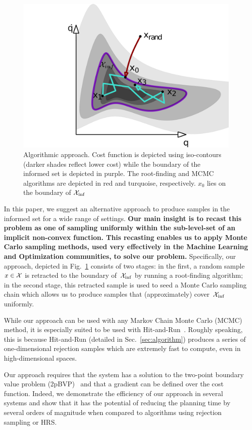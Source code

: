 \documentclass[letterpaper, 10 pt, conference]{ieeeconf}  %
\begin{document}
\begin{figure}[tb]
  \centering
  	\includegraphics[width=0.75\linewidth ]{fig/alg.pdf}
  \caption{
    \captionstyle
  	Algorithmic approach.
  	Cost function is depicted using iso-contours (darker shades reflect lower cost) while the boundary of the informed set is depicted in purple. 
  	The root-finding and MCMC algorithms are depicted in red and turquoise, respectively.
  	$ x_0 $ lies on the boundary of $ \mathcal{X}_{\rm {inf}} $
  	}
   	\label{fig:alg}
\end{figure}


In this paper, we suggest an alternative approach to produce samples in the informed set \Cinf for a wide range of settings.
\textbf{
Our main insight is to recast this problem as one of sampling uniformly within the sub-level-set of an implicit non-convex function.
This recasting enables us to apply Monte Carlo sampling methods, used very effectively in the Machine Learning and Optimization communities, to solve our problem.
}
Specifically, our approach, depicted in Fig.~\ref{fig:alg} consists of two stages:
in the first, a random sample $x \in \mathcal{X}$ is retracted to the boundary of~$\mathcal{X}_{\rm {inf}}$ by running a root-finding algorithm;
in the second stage, this retracted sample  is used to seed a Monte Carlo sampling chain which allows us to  produce samples that (approximately) cover~$\mathcal{X}_{\rm {inf}}$  uniformly.

While our approach can be used with any Markov Chain Monte Carlo (MCMC) method, it is especially suited to be used with Hit-and-Run~\cite{KSZ11}.
Roughly speaking, this is because Hit-and-Run (detailed in Sec.~\ref{sec:algorithm})
produces a series of one-dimensional rejection samples which are extremely fast to compute, even in high-dimensional spaces. 

Our approach requires that the system has a solution to the two-point boundary value problem (2pBVP)~\cite{L06} and that a gradient can be defined over the cost function.
Indeed, we demonstrate the efficiency of our approach in several systems and show that it has the potential of reducing the planning time by several orders of magnitude when compared to algorithms using rejection sampling or HRS.
\end{document}
